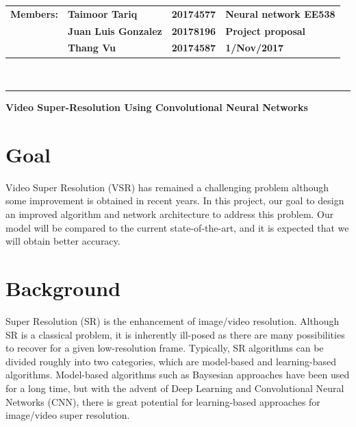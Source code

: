 \documentclass[10pt]{article}
\begin{document}
\noindent
\begin{tabular}{lll R{8.0cm}}
\textbf{Members:} & \textbf{Taimoor Tariq}      & \textbf{20174577} & \textbf{Neural network EE538}\\
\textbf{}         & \textbf{Juan Luis Gonzalez} & \textbf{20178196} & \textbf{Project proposal}\\
\textbf{}         & \textbf{Thang Vu}           & \textbf{20174587} & \textbf{1/Nov/2017}
\end{tabular}\\
\rule[2ex]{\textwidth}{2pt}

{\Large\centerline{\textbf{Video Super-Resolution Using Convolutional Neural Networks}}}

\section{Goal} %
\label{sec:goal}
Video Super Resolution (VSR) has remained a challenging problem although some improvement is obtained in recent years. In this project, our goal to design an improved algorithm and network architecture to address this problem. Our model will be compared to the current state-of-the-art, and it is expected that we will obtain better accuracy. 

\section{Background} %
\label{sec:background}
Super Resolution (SR) is the enhancement of image/video resolution. Although SR is a classical problem, it is inherently ill-posed as there are many possibilities to recover for a given low-resolution frame. Typically, SR algorithms can be divided roughly into two categories, which are model-based and learning-based algorithms. Model-based algorithms such as Baysesian approaches have been used for a long time, but with the advent of Deep Learning and Convolutional Neural Networks (CNN), there is great potential for learning-based approaches for image/video super resolution.
\end{document}
